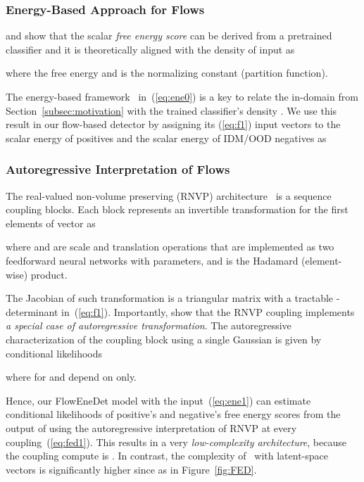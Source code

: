 \documentclass[accepted, startpage]{uai2023}
\begin{document}
\subsubsection{Energy-Based Approach for Flows}\label{subsec:ene}
\citet{Grathwohl2020Your} and \citet{NEURIPS2020_f5496252} show that the scalar \textit{free energy score}  can be derived from a pretrained classifier  and it is theoretically aligned with the density of input  as

where the free energy  and  is the normalizing constant (partition function).

The energy-based framework~\citep{energy} in~(\ref{eq:ene0}) is a key to relate the in-domain  from Section~\ref{subsec:motivation} with the trained classifier's density . We use this result in our flow-based detector by assigning its (\ref{eq:f1}) input vectors  to the scalar energy of positives  and the scalar energy of IDM/OOD negatives  as


\subsubsection{Autoregressive Interpretation of Flows}\label{subsec:maf}
The real-valued non-volume preserving (RNVP) architecture~\citep{45819} is a sequence coupling blocks. Each  block represents an invertible transformation  for the first  elements of vector  as

where  and  are scale and translation operations that are implemented as two feedforward neural networks with  parameters, and  is the Hadamard (element-wise) product.

The Jacobian of such transformation is a triangular matrix with a tractable -determinant in~(\ref{eq:f1}). Importantly, \citet{maf} show that the RNVP coupling implements \textit{a special case of autoregressive transformation}. The autoregressive characterization of the coupling block using a single Gaussian is given by  conditional likelihoods

where  for  and depend on  only.

Hence, our FlowEneDet model with the  input~(\ref{eq:ene1}) can estimate conditional likelihoods of positive's and negative's free energy scores from the output of  using the autoregressive interpretation of RNVP at every coupling~(\ref{eq:fed1}). This results in a very \textit{low-complexity architecture}, because the coupling compute is . In contrast, the complexity of~\citet{fishyscapes} with latent-space vectors  is significantly higher since  as in Figure~\ref{fig:FED}. 
\end{document}
